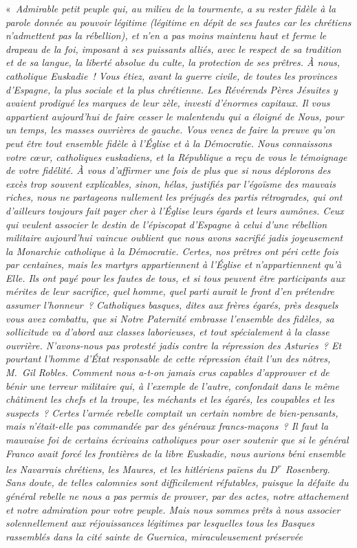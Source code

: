 \documentclass[french,twoside]{book} %
\newenvironment{quoteblock}%
  {\begin{quoting}}
  {\end{quoting}}
\newenvironment{quotebar}{%
    \def\FrameCommand{{\color{rubric!10!}\vrule width 0.5em} \hspace{0.9em}}%
    \def\OuterFrameSep{\itemsep} %
    \MakeFramed {\advance\hsize-\width \FrameRestore}
  }%
  {%
    \endMakeFramed
  }
\renewenvironment{quoteblock}%
  {%
    \savenotes
    \setstretch{0.9}
    \normalfont
    \begin{quotebar}
  }
  {%
    \end{quotebar}
    \spewnotes
  }
\begin{document}
\begin{quoteblock}
 \noindent « \emph{Admirable petit peuple qui, au milieu de la tourmente, a su rester fidèle à la parole donnée au pouvoir légitime (légitime en dépit de ses fautes car les chrétiens n’admettent pas la rébellion), et n’en a pas moins maintenu haut et ferme le drapeau de la foi, imposant à ses puissants alliés, avec le respect de sa tradition et de sa langue, la liberté absolue du culte, la protection de ses prêtres. À nous, catholique Euskadie ! Vous étiez, avant la guerre civile, de toutes les provinces d’Espagne, la plus sociale et la plus chrétienne. Les Révérends Pères Jésuites y avaient prodigué les marques de leur zèle, investi d’énormes capitaux. Il vous appartient aujourd’hui de faire cesser le malentendu qui a éloigné de Nous, pour un temps, les masses ouvrières de gauche. Vous venez de faire la preuve qu’on peut être tout ensemble fidèle à l’Église et à la Démocratie. Nous connaissons votre cœur, catholiques euskadiens, et la République a reçu de vous le témoignage de votre fidélité. À vous d’affirmer une fois de plus que si nous déplorons des excès trop souvent explicables, sinon, hélas, justifiés par l’égoïsme des mauvais riches, nous ne partageons nullement les préjugés des partis rétrogrades, qui ont d’ailleurs toujours fait payer cher à l’Église leurs égards et leurs aumônes. Ceux qui veulent associer le destin de l’épiscopat d’Espagne à celui d’une rébellion militaire aujourd’hui vaincue oublient que nous avons sacrifié jadis joyeusement la Monarchie catholique à la Démocratie. Certes, nos prêtres ont péri cette fois par centaines, mais les martyrs appartiennent à l’Église et n’appartiennent qu’à Elle. Ils ont payé pour les fautes de tous, et si tous peuvent être participants aux mérites de leur sacrifice, quel homme, quel parti aurait le front d’en prétendre assumer l’honneur ? Catholiques basques, dites aux frères égarés, près desquels vous avez combattu, que si Notre Paternité embrasse l’ensemble des fidèles, sa sollicitude va d’abord aux classes laborieuses, et tout spécialement à la classe ouvrière. N’avons-nous pas protesté jadis contre la répression des Asturies ? Et pourtant l’homme d’État responsable de cette répression était l’un des nôtres, M. Gil Robles. Comment nous a-t-on jamais crus capables d’approuver et de bénir une terreur militaire qui, à l’exemple de l’autre, confondait dans le même châtiment les chefs et la troupe, les méchants et les égarés, les coupables et les suspects ? Certes l’armée rebelle comptait un certain nombre de bien-pensants, mais n’était-elle pas commandée par des généraux francs-maçons ? Il faut la mauvaise foi de certains écrivains catholiques pour oser soutenir que si le général Franco avait forcé les frontières de la libre Euskadie, nous aurions béni ensemble les Navarrais chrétiens, les Maures, et les hitlériens païens du D\textsuperscript{r} Rosenberg. Sans doute, de telles calomnies sont difficilement réfutables, puisque la défaite du général rebelle ne nous a pas permis de prouver, par des actes, notre attachement et notre admiration pour votre peuple. Mais nous sommes prêts à nous associer solennellement aux réjouissances légitimes par lesquelles tous les Basques rassemblés dans la cité sainte de Guernica, miraculeusement préservée 
\end{quoteblock}
\end{document}
